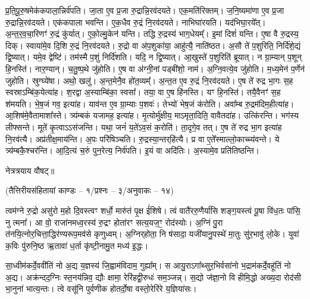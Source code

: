 प्र॒ति॒पू॒रु॒षमेक॑कपाला॒न्निर्व॑पति। जा॒ता ए॒व प्र॒जा रु॒द्रान्नि॒रव॑दयते। एक॒मति॑\-रिक्तम्। ज॒नि॒ष्यमा॑णा ए॒व प्र॒जा रु॒द्रान्नि॒रव॑दयते। एक॑कपाला भवन्ति। ए॒क॒धैव रु॒द्रं नि॒रव॑दयते। नाभिघा॑रयति। यद॑भिघा॒रये᳚त्। अ॒न्त॒र॒व॒चा॒रिणꣳ॑ रु॒द्रं कु॑र्यात्। ए॒को॒ल्मु॒केन॑ यन्ति। 
तद्धि रु॒द्रस्य॑ भाग॒धेयम्᳚। इ॒मां दिशं॑ यन्ति। ए॒षा वै रु॒द्रस्य॒ दिक्। स्वाया॑मे॒व दि॒शि रु॒द्रं नि॒रव॑दयते। रु॒द्रो वा अ॑प॒शुका॑या॒ आहु॑त्यै॒ नाति॑ष्ठत। अ॒सौ ते॑ प॒शुरिति॒ निर्दि॑शे॒द्यं द्वि॒ष्यात्। यमे॒व द्वेष्टि॑। तम॑स्मै प॒शुं निर्दि॑शति। यदि॒ न द्वि॒ष्यात्। आ॒खुस्ते॑ प॒शुरिति॑ ब्रूयात्। 
न ग्रा॒म्यान् प॒शून् हि॒नस्ति॑। नार॒ण्यान्। च॒तु॒ष्प॒थे जु॑होति। ए॒ष वा अ॑ग्नी॒नां पड्बी॑शो॒ नाम॑। अ॒ग्नि॒वत्ये॒व जु॑होति। म॒ध्य॒मेन॑ प॒र्णेन॑ जुहोति। स्रुग्घ्ये॑षा। अथो॒ खलु॑। अ॒न्त॒मेनै॒व हो॑त॒व्यम्᳚। अ॒न्त॒त ए॒व रु॒द्रं नि॒रव॑दयते। 
ए॒ष ते॑ रुद्र भा॒गः स॒ह स्वस्राऽम्बि॑क॒येत्या॑ह। श॒रद्वा अ॒स्याम्बि॑का॒ स्वसा᳚। तया॒ वा ए॒ष हि॑नस्ति। यꣳ हि॒नस्ति॑। तयै॒वैनꣳ॑ स॒ह श॑मयति। भे॒ष॒जं गव॒ इत्या॑ह। याव॑न्त ए॒व ग्रा॒म्याः प॒शवः॑। तेभ्यो॑ भेष॒जं क॑रोति। अवा᳚म्ब रु॒द्रम॑दिम॒हीत्या॑ह। आ॒शिष॑मे॒वैतामाशा᳚स्ते। 
त्र्य॑म्बकं यजामह॒ इत्या॑ह। मृ॒त्योर्मु॑क्षीय॒ माऽमृता॒दिति॒ वावैतदा॑ह। उत्कि॑रन्ति। भग॑स्य लीफ्सन्ते। मूते॑ कृ॒त्वाऽऽस॑जन्ति। यथा॒ जनं॑ य॒ते॑ऽव॒सं क॒रोति॑। ता॒दृगे॒व तत्। ए॒ष ते॑ रुद्र भा॒ग इत्या॑ह नि॒रव॑त्यै। अप्र॑तीक्ष॒माय॑न्ति। अ॒पः परि॑षिञ्चति। \mbox{रु॒द्रस्या॒न्तर्‌\mbox{}हि॑त्यै}। प्र वा ए॒ते᳚स्माल्लो॒काच्च्य॑वन्ते। ये त्र्य॑म्बकै॒श्चर॑न्ति। आ॒दि॒त्यं च॒रुं पुन॒रेत्य॒ निर्व॑पति। इ॒यं वा अदि॑तिः। अ॒स्यामे॒व प्रति॑तिष्ठन्ति। 

नेत्रत्रयाय वौषट्॥

{\small\closesection}


{}
\centerline{\scriptsize (तैत्तिरीयसंहितायां काण्डः – १/प्रश्नः – ३/अनुवाकः – १४)}

त्वम॑ग्ने रु॒द्रो असु॑रो म॒हो दि॒वस्त्वꣳ शर्धो॒ मारु॑तं पृ॒क्ष ई॑शिषे। त्वं वातै॑ररु॒णैर्या॑सि शङ्ग॒यस्त्वं पू॒षा वि॑ध॒तः पा॑सि॒ नु त्मना᳚।
आ वो॒ राजा॑नमध्व॒रस्य॑ रु॒द्रꣳ होता॑रꣳ सत्य॒यज॒ꣳ॒ रोद॑स्योः। अ॒ग्निं पु॒रा त॑नयि॒त्नोर॒चित्ता॒द्धिर॑ण्यरूप॒मव॑से कृणुध्वम्। अ॒ग्निर्‌होता॒ नि ष॑सादा॒ यजी॑यानु॒पस्थे॑ मा॒तुः सु॑र॒भावु॑ लो॒के। युवा॑ क॒विः पु॑रुनि॒ष्ठ ऋ॒तावा॑ ध॒र्ता कृ॑ष्टी॒नामु॒त मध्य॑ इ॒द्धः। 

सा॒ध्वीम॑कर्दे॒ववी॑तिं नो अ॒द्य य॒ज्ञस्य॑ जि॒ह्वाम॑विदाम॒ गुह्या᳚म्। स आयु॒रा\-ऽ\-गा᳚थ्सुर॒भिर्वसा॑नो भ॒द्राम॑कर्दे॒वहू॑तिं नो अ॒द्य। अक्र॑न्दद॒ग्निः स्त॒नय॑न्निव॒ द्यौः क्षामा॒ रेरि॑हद्वी॒रुधः॑ सम॒ञ्जन्न्। स॒द्यो ज॑ज्ञा॒नो वि हीमि॒द्धो अख्य॒दा रोद॑सी भा॒नुना॑ भात्य॒न्तः। त्वे वसू॑नि पुर्वणीक होतर्दो॒षा वस्तो॒रेरि॑रे य॒ज्ञिया॑सः। 

